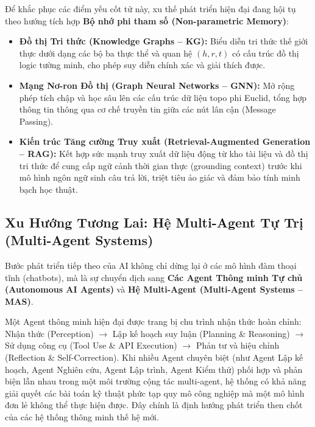\documentclass[12pt,a4paper]{report}
\begin{document}
Để khắc phục các điểm yếu cốt tử này, xu thế phát triển hiện đại đang hội tụ theo hướng tích hợp \textbf{Bộ nhớ phi tham số (Non-parametric Memory)}:
\begin{itemize}[leftmargin=1.2cm]
    \item \textbf{Đồ thị Tri thức (Knowledge Graphs -- KG):} Biểu diễn tri thức thế giới thực dưới dạng các bộ ba thực thể và quan hệ $(h, r, t)$ có cấu trúc đồ thị logic tường minh, cho phép suy diễn chính xác và giải thích được.
    \item \textbf{Mạng Nơ-ron Đồ thị (Graph Neural Networks -- GNN):} Mở rộng phép tích chập và học sâu lên các cấu trúc dữ liệu topo phi Euclid, tổng hợp thông tin thông qua cơ chế truyền tin giữa các nút lân cận (Message Passing).
    \item \textbf{Kiến trúc Tăng cường Truy xuất (Retrieval-Augmented Generation -- RAG):} Kết hợp sức mạnh truy xuất dữ liệu động từ kho tài liệu và đồ thị tri thức để cung cấp ngữ cảnh thời gian thực (grounding context) trước khi mô hình ngôn ngữ sinh câu trả lời, triệt tiêu ảo giác và đảm bảo tính minh bạch học thuật.
\end{itemize}

\subsection{Xu Hướng Tương Lai: Hệ Multi-Agent Tự Trị (Multi-Agent Systems)}
Bước phát triển tiếp theo của AI không chỉ dừng lại ở các mô hình đàm thoại tĩnh (chatbots), mà là sự chuyển dịch sang \textbf{Các Agent Thông minh Tự chủ (Autonomous AI Agents)} và \textbf{Hệ Multi-Agent (Multi-Agent Systems -- MAS)}. 

Một Agent thông minh hiện đại được trang bị chu trình nhận thức hoàn chỉnh: Nhận thức (Perception) $\rightarrow$ Lập kế hoạch suy luận (Planning \& Reasoning) $\rightarrow$ Sử dụng công cụ (Tool Use \& API Execution) $\rightarrow$ Phản tư và hiệu chỉnh (Reflection \& Self-Correction). Khi nhiều Agent chuyên biệt (như Agent Lập kế hoạch, Agent Nghiên cứu, Agent Lập trình, Agent Kiểm thử) phối hợp và phản biện lẫn nhau trong một môi trường cộng tác multi-agent, hệ thống có khả năng giải quyết các bài toán kỹ thuật phức tạp quy mô công nghiệp mà một mô hình đơn lẻ không thể thực hiện được. Đây chính là định hướng phát triển then chốt của các hệ thống thông minh thế hệ mới.

\newpage


\end{document}
